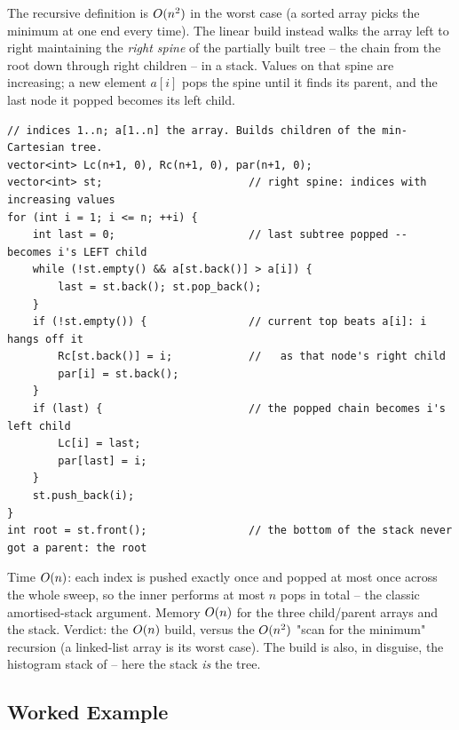 The recursive definition is $O(n^2)$ in the worst case (a sorted array picks the minimum at one end
every time). The linear build instead walks the array left to right maintaining the \emph{right spine}
of the partially built tree -- the chain from the root down through right children -- in a stack. Values
on that spine are increasing; a new element $a[i]$ pops the spine until it finds its parent, and the
last node it popped becomes its left child.

\begin{lstlisting}[caption={The $O(n)$ monotonic-stack build of a min-Cartesian tree; \code{Lc[], Rc[]} are the left and right children}, label={lst:c26-stackbuild}]
// indices 1..n; a[1..n] the array. Builds children of the min-Cartesian tree.
vector<int> Lc(n+1, 0), Rc(n+1, 0), par(n+1, 0);
vector<int> st;                       // right spine: indices with increasing values
for (int i = 1; i <= n; ++i) {
    int last = 0;                     // last subtree popped -- becomes i's LEFT child
    while (!st.empty() && a[st.back()] > a[i]) {
        last = st.back(); st.pop_back();
    }
    if (!st.empty()) {                // current top beats a[i]: i hangs off it
        Rc[st.back()] = i;            //   as that node's right child
        par[i] = st.back();
    }
    if (last) {                       // the popped chain becomes i's left child
        Lc[i] = last;
        par[last] = i;
    }
    st.push_back(i);
}
int root = st.front();                // the bottom of the stack never got a parent: the root
\end{lstlisting}
\begin{complexitybox}
Time $O(n)$: each index is pushed exactly once and popped at most once across the whole sweep, so
the inner  performs at most $n$ pops in total -- the classic amortised-stack argument.
Memory $O(n)$ for the three child/parent arrays and the stack. Verdict: the $O(n)$ build, versus
the $O(n^2)$ "scan for the minimum" recursion (a linked-list array is its worst case). The build is
also, in disguise, the histogram stack of  -- here the stack \emph{is} the tree.
\end{complexitybox}

\subsection{Worked Example}

